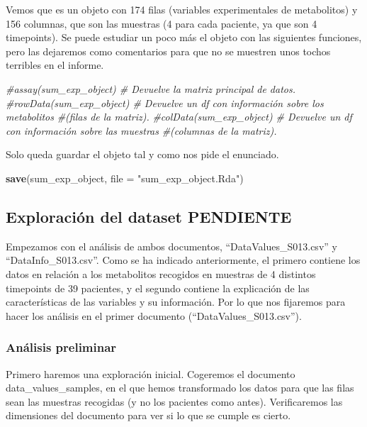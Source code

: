 \documentclass[
]{article}
\newenvironment{Shaded}{\begin{snugshade}}{\end{snugshade}}
\newcommand{\AttributeTok}[1]{\textcolor[rgb]{0.13,0.29,0.53}{#1}}
\newcommand{\CommentTok}[1]{\textcolor[rgb]{0.56,0.35,0.01}{\textit{#1}}}
\newcommand{\FunctionTok}[1]{\textcolor[rgb]{0.13,0.29,0.53}{\textbf{#1}}}
\newcommand{\NormalTok}[1]{#1}
\newcommand{\StringTok}[1]{\textcolor[rgb]{0.31,0.60,0.02}{#1}}
\begin{document}
Vemos que es un objeto con 174 filas (variables experimentales de
metabolitos) y 156 columnas, que son las muestras (4 para cada paciente,
ya que son 4 timepoints). Se puede estudiar un poco más el objeto con
las siguientes funciones, pero las dejaremos como comentarios para que
no se muestren unos tochos terribles en el informe.

\begin{Shaded}
\begin{Highlighting}[]
\CommentTok{\#assay(sum\_exp\_object) \# Devuelve la matriz principal de datos.}
\CommentTok{\#rowData(sum\_exp\_object) \# Devuelve un df con información sobre los metabolitos }
\CommentTok{\#(filas de la matriz).}
\CommentTok{\#colData(sum\_exp\_object) \# Devuelve un df con información sobre las muestras }
\CommentTok{\#(columnas de la matriz).}
\end{Highlighting}
\end{Shaded}

Solo queda guardar el objeto tal y como nos pide el enunciado.

\begin{Shaded}
\begin{Highlighting}[]
\FunctionTok{save}\NormalTok{(sum\_exp\_object, }\AttributeTok{file =} \StringTok{"sum\_exp\_object.Rda"}\NormalTok{)}
\end{Highlighting}
\end{Shaded}

\subsection{Exploración del dataset
PENDIENTE}\label{exploraciuxf3n-del-dataset-pendiente-1}

Empezamos con el análisis de ambos documentos, ``DataValues\_S013.csv''
y ``DataInfo\_S013.csv''. Como se ha indicado anteriormente, el primero
contiene los datos en relación a los metabolitos recogidos en muestras
de 4 distintos timepoints de 39 pacientes, y el segundo contiene la
explicación de las características de las variables y su información.
Por lo que nos fijaremos para hacer los análisis en el primer documento
(``DataValues\_S013.csv'').

\subsubsection{Análisis preliminar}\label{anuxe1lisis-preliminar}

Primero haremos una exploración inicial. Cogeremos el documento
data\_values\_samples, en el que hemos transformado los datos para que
las filas sean las muestras recogidas (y no los pacientes como antes).
Verificaremos las dimensiones del documento para ver si lo que se cumple
es cierto.
\end{document}
